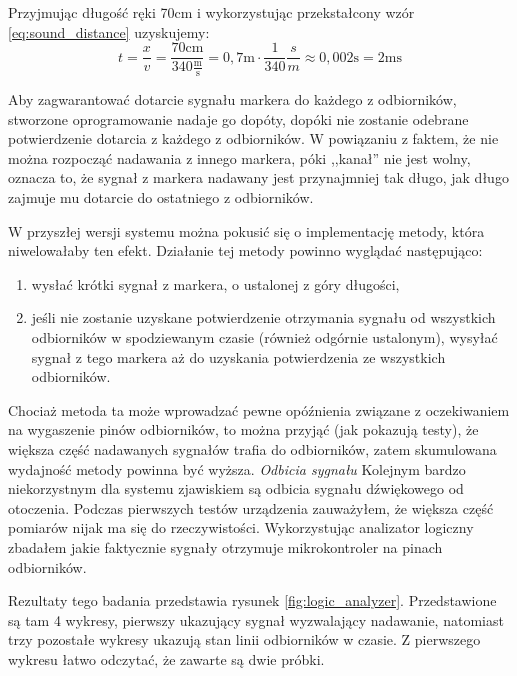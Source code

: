 Przyjmując długość ręki 70cm i wykorzystując przekstałcony wzór \ref{eq:sound_distance} uzyskujemy:
\begin{equation}
 t = \frac{x}{v} = \frac{70\textrm{cm}}{340\frac{\textrm{m}}{\textrm{s}}} = 0,7\textrm{m} \cdot \frac{1}{340}\frac{s}{m} \approx 0,002\textrm{s} = 2\textrm{ms}
 \label{eq:reporting_speed}
\end{equation}

Aby zagwarantować dotarcie sygnału markera do każdego z odbiorników, stworzone oprogramowanie nadaje go dopóty, dopóki nie zostanie odebrane potwierdzenie dotarcia z każdego z odbiorników. W powiązaniu z faktem, że nie można rozpocząć nadawania z innego markera, póki ,,kanał'' nie jest wolny, oznacza to, że sygnał z markera nadawany jest przynajmniej tak długo, jak długo zajmuje mu dotarcie do ostatniego z odbiorników.

W przyszłej wersji systemu można pokusić się o implementację metody, która niwelowałaby ten efekt. Działanie tej metody powinno wyglądać następująco:
\begin{enumerate}
 \item wysłać krótki sygnał z markera, o ustalonej z góry długości,
 \item jeśli nie zostanie uzyskane potwierdzenie otrzymania sygnału od wszystkich odbiorników w spodziewanym czasie (również odgórnie ustalonym), wysyłać sygnał z tego markera aż do uzyskania potwierdzenia ze wszystkich odbiorników.
\end{enumerate}
Chociaż metoda ta może wprowadzać pewne opóźnienia związane z oczekiwaniem na wygaszenie pinów odbiorników, to można przyjąć (jak pokazują testy), że większa część nadawanych sygnałów trafia do odbiorników, zatem skumulowana wydajność metody powinna być wyższa.
\newline
\newline
\textsl{Odbicia sygnału}
Kolejnym bardzo niekorzystnym dla systemu zjawiskiem są odbicia sygnału dźwiękowego od otoczenia. Podczas pierwszych testów urządzenia zauważyłem, że większa część pomiarów nijak ma się do rzeczywistości. Wykorzystując analizator logiczny zbadałem jakie faktycznie sygnały otrzymuje mikrokontroler na pinach odbiorników.

Rezultaty tego badania przedstawia rysunek \ref{fig:logic_analyzer}. Przedstawione są tam 4 wykresy, pierwszy ukazujący sygnał wyzwalający nadawanie, natomiast trzy pozostałe wykresy ukazują stan linii odbiorników w czasie. Z pierwszego wykresu łatwo odczytać, że zawarte są dwie próbki.

